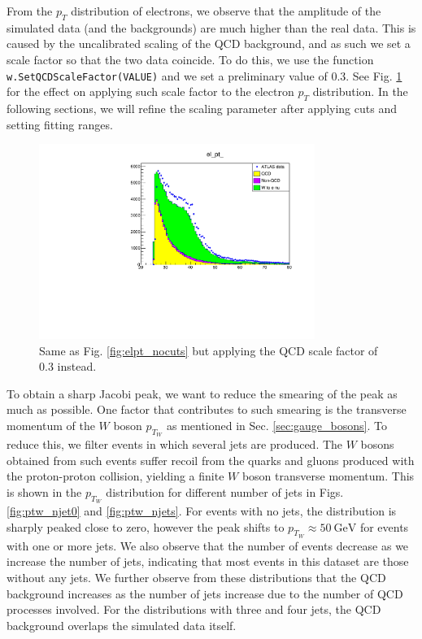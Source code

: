 \documentclass[a4paper]{report}
\numberwithin{equation}{section}
\begin{document}
From the $p_T$ distribution of electrons, we observe that the amplitude of the simulated data (and the backgrounds) are much 
higher than the real data. This is caused by the uncalibrated scaling of the QCD background, and as such we set a scale factor 
so that the two data coincide. To do this, we use the function \texttt{w.SetQCDScaleFactor(VALUE)} and we set a preliminary 
value of 0.3. See Fig. \ref{fig:elpt_qcd30} for the effect on applying such scale factor to the electron $p_T$ distribution. In the following sections, we will refine the scaling parameter after applying cuts and setting fitting ranges. \par

\begin{figure}[htpb]
    \centering
    \includegraphics[width=0.8\textwidth]{elpt_qcd30.pdf}
    \caption{Same as Fig. \ref{fig:elpt_nocuts} but applying the QCD scale factor of 0.3 instead.}
    \label{fig:elpt_qcd30}
\end{figure}

 

To obtain a sharp Jacobi peak, we want to reduce the smearing of the peak as much as possible. One factor that contributes 
to such smearing is the transverse momentum of the $W$ boson $p_{T_W}$ as mentioned in Sec. \ref*{sec:gauge_bosons}. To reduce this, 
we filter events in which several jets are produced. The $W$ bosons obtained from such events suffer recoil from the quarks and gluons 
produced with the proton-proton collision, yielding a finite $W$ boson transverse momentum. This is shown in the $p_{T_W}$ distribution 
for different number of jets in Figs. \ref{fig:ptw_njet0} and \ref{fig:ptw_njets}. For events with no jets, the distribution is 
sharply peaked close to zero, however the peak shifts to $p_{T_W} \approx \SI{50}{\giga\electronvolt}$ for events with one or more jets. 
We also observe that the number of events decrease as we increase the number of jets, indicating that most events in this dataset are those without any jets. We further observe from these distributions that the QCD background increases as the number of jets increase due to the number of QCD processes involved. For the distributions with 
three and four jets, the QCD background overlaps the simulated data itself.  
\end{document}
